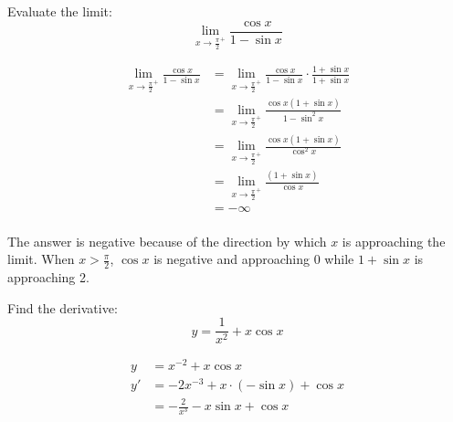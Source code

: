 \documentclass[fleqn,addpoints]{exam}
\begin{document}
\begin{questions}
\begin{parts}
\end{parts}

\question
Evaluate the limit:
\[
  \lim_{x \to \frac{\pi}{2}^+} \frac{\cos x}{1 - \sin x}
\]

\begin{solution}
\begin{align*}
  \lim_{x \to \frac{\pi}{2}^+} \frac{\cos x}{1 - \sin x} &=
    \lim_{x \to \frac{\pi}{2}^+} \frac{\cos x}{1 - \sin x} \cdot \frac{1 + \sin x}{1 + \sin x} \\
  &= \lim_{x \to \frac{\pi}{2}^+} \frac{\cos x (1 + \sin x)}{1 - \sin^2 x} \\
  &= \lim_{x \to \frac{\pi}{2}^+} \frac{\cos x (1 + \sin x)}{\cos^2 x} \\
  &= \lim_{x \to \frac{\pi}{2}^+} \frac{(1 + \sin x)}{\cos x} \\
  &= - \infty \\  
\end{align*}

The answer is negative because of the direction by which $x$ is approaching the limit.  When $x > \frac{\pi}{2}$, 
 $\cos x$ is negative and approaching 0 while $1 + \sin x$ is approaching 2.
\end{solution}



\question
Find the derivative:
\[
  y = \frac{1}{x^2} + x \cos x
\]

\begin{solution}
\begin{align*}
  y &= x^{-2} + x \cos x \\
  y' &= -2x^{-3} + x \cdot (- \sin x) + \cos x \\
     &= - \frac{2}{x^3} - x \sin x + \cos x \\
\end{align*}
  
\end{solution}

\end{questions}
\end{document}

